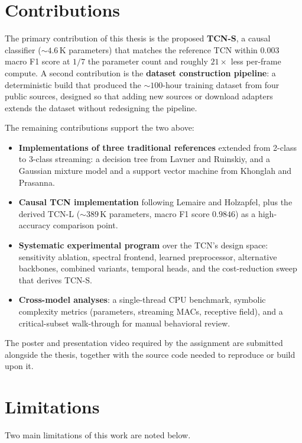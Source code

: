 \section{Contributions}
\label{sec:conclusion_contributions}

The primary contribution of this thesis is the proposed \textbf{TCN-S}, a causal classifier ($\sim 4.6$\,K parameters) that matches the reference TCN within $0.003$ macro F1 score at $1/7$ the parameter count and roughly $21\times$ less per-frame compute.
A second contribution is the \textbf{dataset construction pipeline}: a deterministic build that produced the $\sim 100$-hour training dataset from four public sources, designed so that adding new sources or download adapters extends the dataset without redesigning the pipeline.

The remaining contributions support the two above:
\begin{itemize}
    \item \textbf{Implementations of three traditional references} extended from 2-class to 3-class streaming: a decision tree from Lavner and Ruinskiy, and a Gaussian mixture model and a support vector machine from Khonglah and Prasanna.
    \item \textbf{Causal TCN implementation} following Lemaire and Holzapfel, plus the derived TCN-L ($\sim 389$\,K parameters, macro F1 score $0.9846$) as a high-accuracy comparison point.
    \item \textbf{Systematic experimental program} over the TCN's design space: sensitivity ablation, spectral frontend, learned preprocessor, alternative backbones, combined variants, temporal heads, and the cost-reduction sweep that derives TCN-S.
    \item \textbf{Cross-model analyses}: a single-thread CPU benchmark, symbolic complexity metrics (parameters, streaming MACs, receptive field), and a critical-subset walk-through for manual behavioral review.
\end{itemize}

The poster and presentation video required by the assignment are submitted alongside the thesis, together with the source code needed to reproduce or build upon it.

\section{Limitations}
\label{sec:conclusion_limitations}

Two main limitations of this work are noted below.

